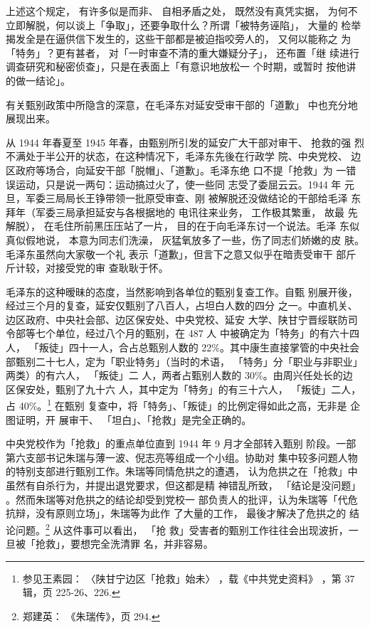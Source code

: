 上述这个规定， 有许多似是而非、 自相矛盾之处， 既然没有真凭实据， 为何不
立即解脱，何以谈上「争取」，还要争取什么？所谓「被特务诬陷」， 大量的
检举揭发全是在逼供信下发生的，这些干部都是被迫指咬旁人的， 又何以能称之
为 「特务」？更有甚者， 对「一时审查不清的重大嫌疑分子」， 还布置「继
续进行调查研究和秘密侦查」，只是在表面上「有意识地放松一 个时期，或暂时
按他讲的做一结论」。

有关甄别政策中所隐含的深意，在毛泽东对延安受审干部的「道歉」
中也充分地展现出来。

从 1944 年春夏至 1945 年春，由甄别所引发的延安广大干部对审干、 抢救的强
烈不满处于半公开的状态，在这种情况下，毛泽东先後在行政学 院、中央党校、
边区政府等场合，向延安干部「脱帽」、「道歉」。毛泽东绝 口不提「抢救」为
一错误运动，只是说一两句：运动搞过火了，使一些同 志受了委屈云云。1944 年
元旦，军委三局局长王铮带领一批原受审查、刚 被解脱还没做结论的干部给毛泽
东拜年（军委三局承担延安与各根据地的 电讯往来业务， 工作极其繁重， 故最
先解脱）， 在毛住所前黑压压站了一片， 目的在于向毛泽东讨一个说法。毛泽
东似真似假地说， 本意为同志们洗澡， 灰猛氧放多了一些，伤了同志们娇嫩的皮
肤。毛泽东虽然向大家敬一个礼 表示「道歉」，但言下之意又似乎在暗责受审干
部斤斤计较，对接受党的审 查耿耿于怀。

毛泽东的这种暧昧的态度，当然影响到各单位的甄别复查工作。自甄 别展开後，
经过三个月的复查，延安仅甄别了八百人，占坦白人数的四分 之一。中直机关、
边区政府、中央社会部、边区保安处、中央党校、延安 大学、陕甘宁晋绥联防司
令部等七个单位，经过八个月的甄别，在 487 人 中被确定为「特务」的有六十四
人， 「叛徒」四十一人，合占总甄别人数的 22\%。其中康生直接掌管的中央社会
部甄别二十七人，定为「职业特务」（当时的术语， 「特务」分「职业与非职业」
两类）的有六人， 「叛徒」二 人，两者占甄别人数的 30\%。由周兴任处长的边
区保安处，甄别了九十六 人，其中定为「特务」的有三十六人， 「叛徒」二人，
占 40\%。\footnote{参见王素园：
〈陕甘宁边区「抢救」始未〉
，载《中共党史资料》
，第 37 辑，页 225-26、226.} 在甄别 复查中，将「特务」、「叛徒」的比例定得如此之高，无非是
企图证明，开 展审干、 「坦白」、「抢救」是完全正确的。

中央党校作为「抢救」的重点单位直到 1944 年 9 月才全部转入甄别 阶段。一部
第六支部书记朱瑞与薄一波、倪志亮等组成一个小组。协助对 集中较多问题人物
的特别支部进行甄别工作。朱瑞等同情危拱之的遭遇， 认为危拱之在「抢救」中
虽然有自杀行为，并提出退党要求，但这都是精 神错乱所致， 「结论是没问题」
。然而朱瑞等对危拱之的结论却受到党校一 部负责人的批评，认为朱瑞等「代危
抗辩，没有原则立场」，朱瑞等为此作 了大量的工作， 最後才解决了危拱之的
结论问题。\footnote{郑建英： 《朱瑞传》，页 294.} 从这件事可以看出，
「抢 救」受害者的甄别工作往往会出现波折，一旦被「抢救」，要想完全洗清罪
名，并非容易。

